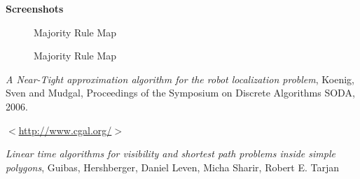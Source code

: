 \documentclass[a4paper,10pt]{article}
\begin{document}
{\bf Screenshots}
\begin{figure}[h]
\begin{center}
\caption{\label{fig:Majority Rule Map}Majority Rule Map}
\end{center}
\end{figure}


\begin{figure}[h]
\begin{center}
\caption{\label{fig:Majority Rule Map}Majority Rule Map}
\end{center}
\end{figure}


\newpage

\begin{thebibliography}{1}
 \emph{A Near-Tight approximation algorithm for the robot localization problem},
 Koenig, Sven and Mudgal, Proceedings of the Symposium on Discrete Algorithms SODA, 2006.

 $<$\url{http://www.cgal.org/}$>$

 \emph{Linear time algorithms for visibility and shortest path problems inside simple polygons}, Guibas, 
Hershberger, Daniel Leven, Micha Sharir, Robert E. Tarjan
\end{thebibliography}
\end{document}
